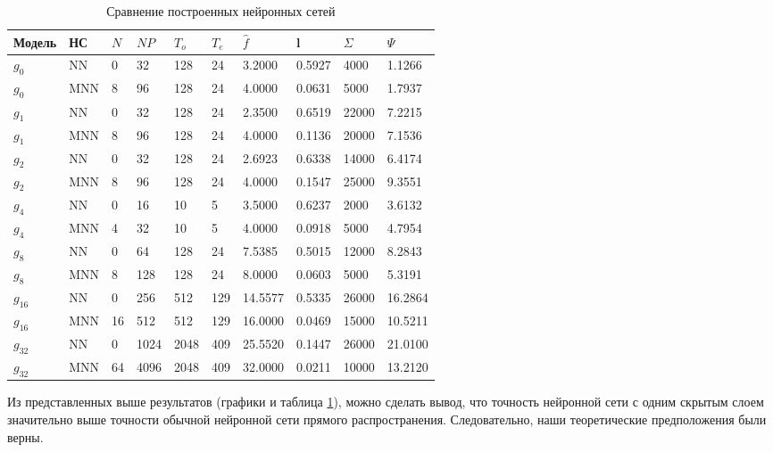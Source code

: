 \begin{table}[H]
	\begin{tabular}{|l|l|l|l|l|l|l|l|l|l|}
		\hline
		Модель    & НС   & $N$&$NP$& $T_o$       & $T_e$  & $\hat{f}$ & l   & $\Sigma$ & $\Psi$ \\ \hline
		$ g_{0} $ & NN 	 & 0  & 32 & 128 & 24  & 3.2000 & 0.5927 & 4000 & 1.1266 \\ \hline
		$ g_{0} $ & MNN  & 8  & 96 & 128 & 24  & 4.0000 & 0.0631 & 5000 & 1.7937 \\ \hline
		$ g_{1} $ & NN 	 & 0  & 32 & 128 & 24  & 2.3500 & 0.6519 & 22000 & 7.2215 \\ \hline
		$ g_{1} $ & MNN  & 8  & 96 & 128 & 24  & 4.0000 & 0.1136 & 20000 & 7.1536 \\ \hline
		$ g_{2} $ & NN 	 & 0  & 32 & 128 & 24  & 2.6923 & 0.6338 & 14000 & 6.4174 \\ \hline
		$ g_{2} $ & MNN  & 8  & 96 & 128 & 24  & 4.0000 & 0.1547 & 25000 & 9.3551 \\ \hline
		$ g_{4} $ & NN 	 & 0  & 16 & 10  & 5   & 3.5000 & 0.6237 & 2000 & 3.6132 \\ \hline
		$ g_{4} $ & MNN  & 4  & 32 & 10  & 5   & 4.0000 & 0.0918 & 5000 & 4.7954 \\ \hline
		$ g_{8} $ & NN 	 & 0  & 64 & 128 & 24  & 7.5385 & 0.5015 & 12000 & 8.2843 \\ \hline
		$ g_{8} $ & MNN  & 8  & 128 & 128& 24  & 8.0000 & 0.0603 & 5000 & 5.3191 \\ \hline
		$ g_{16} $ & NN  & 0  & 256 & 512& 129 & 14.5577 & 0.5335 & 26000 & 16.2864 \\ \hline
		$ g_{16} $ & MNN & 16 & 512 & 512& 129 & 16.0000 & 0.0469 & 15000 & 10.5211 \\ \hline
		$ g_{32} $ & NN  & 0  & 1024 & 2048 & 409 & 25.5520 & 0.1447 & 26000 & 21.0100 \\ \hline
		$ g_{32} $ & MNN & 64 & 4096 & 2048 & 409 & 32.0000 & 0.0211 & 10000 & 13.2120 \\ \hline
		
	\hline
	\end{tabular}
	\caption{Сравнение построенных нейронных сетей}
	\label{diff_g}
\end{table}
\bigskip

Из представленных выше результатов (графики и таблица \ref{diff_g}), можно сделать вывод, 
что точность нейронной сети с одним скрытым слоем значительно выше точности обычной нейронной сети прямого распространения.
Следовательно, наши теоретические предположения были верны.


